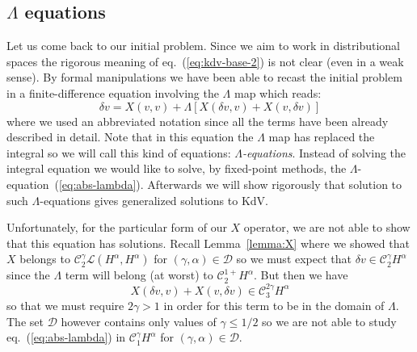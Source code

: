 \documentclass[a4paper,12pt,reqno]{article}
\newcommand{\der}{\delta}
\newcommand{\CC}{\mathcal{C}}
\newcommand{\DD}{\mathcal{D}}
\newcommand{\LL}{\mathcal{L}}
\begin{document}
\subsection{$\Lambda$ equations}

Let us come back to our initial problem. Since we aim to work in distributional spaces the rigorous meaning of eq.~(\ref{eq:kdv-base-2}) is not clear (even in a weak sense). By formal manipulations we have been able to recast the initial problem in a finite-difference equation involving the $\Lambda$ map which reads:
\begin{equation}
  \label{eq:abs-lambda}
\der v = X(v,v) + \Lambda[X(\der v, v) + X(v, \der v)]   
\end{equation}
where we used an abbreviated notation since all the terms have been
already described in detail. Note that in this equation the $\Lambda$ map has replaced the integral
 so we
will call this kind of equations: \emph{$\Lambda$-equations}. Instead
of solving the integral equation 
we would like to  solve, by fixed-point
methods, the $\Lambda$-equation~(\ref{eq:abs-lambda}). Afterwards we will show rigorously that solution to such $\Lambda$-equations gives generalized solutions to KdV.

\bigskip
  Unfortunately,
for the particular form of our $X$ operator, we are not able to show
that this equation has solutions. Recall  Lemma~\ref{lemma:X} where we showed that $X$ belongs to 
$\CC_2^\gamma \LL(H^\alpha,H^\alpha)$ for $(\gamma,\alpha) \in \DD$ so we
must expect that $\der v \in \CC_2^\gamma  H^\alpha$ since the
$\Lambda$ term will belong (at worst) to $\CC_2^{1+} H^\alpha$. But then we have
$$
X(\der v,v) + X(v,\der v) \in \CC_3^{2\gamma} H^\alpha
$$ 
so that we must require $2\gamma > 1$ in order for this term to be in
the domain of $\Lambda$. The  set $\DD$ however contains only
values of $\gamma \le 1/2$ so we are not able to study
eq.~(\ref{eq:abs-lambda}) in $\CC_1^\gamma H^\alpha$ for
$(\gamma,\alpha) \in \DD$.
\end{document}
